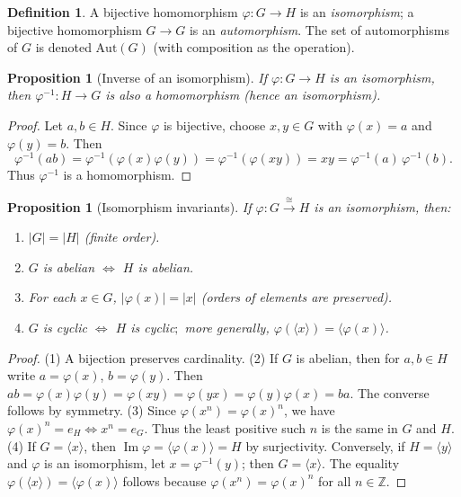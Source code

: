 \documentclass[12pt]{article}
\newtheorem{proposition}[theorem]{Proposition}
\theoremstyle{definition}
\newtheorem{definition}{Definition}
\begin{document}
\begin{definition}
A bijective homomorphism $\varphi:G\to H$ is an \emph{isomorphism}; a bijective homomorphism $G\to G$
is an \emph{automorphism}. The set of automorphisms of $G$ is denoted $\mathrm{Aut}(G)$
(with composition as the operation).
\end{definition}

\begin{proposition}[Inverse of an isomorphism]
If $\varphi:G\to H$ is an isomorphism, then $\varphi^{-1}:H\to G$ is also a homomorphism (hence an isomorphism).
\end{proposition}

\begin{proof}
Let $a,b\in H$. Since $\varphi$ is bijective, choose $x,y\in G$ with $\varphi(x)=a$ and $\varphi(y)=b$.
Then
\[
\varphi^{-1}(ab) = \varphi^{-1}(\varphi(x)\varphi(y)) = \varphi^{-1}(\varphi(xy)) = xy
= \varphi^{-1}(a)\,\varphi^{-1}(b).
\]
Thus $\varphi^{-1}$ is a homomorphism.
\end{proof}

\begin{proposition}[Isomorphism invariants]
If $\varphi:G\stackrel{\cong}{\longrightarrow} H$ is an isomorphism, then:
\begin{enumerate}
    \item $|G|=|H|$ (finite order).
    \item $G$ is abelian $\iff$ $H$ is abelian.
    \item For each $x\in G$, $|\varphi(x)|=|x|$ (orders of elements are preserved).
    \item $G$ is cyclic $\iff$ $H$ is cyclic$;$ more generally, $\varphi(\langle x\rangle)=\langle \varphi(x)\rangle$.
\end{enumerate}
\end{proposition}

\begin{proof}
(1) A bijection preserves cardinality.  
(2) If $G$ is abelian, then for $a,b\in H$ write $a=\varphi(x)$, $b=\varphi(y)$.
Then $ab=\varphi(x)\varphi(y)=\varphi(xy)=\varphi(yx)=\varphi(y)\varphi(x)=ba$.
The converse follows by symmetry.  
(3) Since $\varphi(x^n)=\varphi(x)^n$, we have $\varphi(x)^n=e_H \iff x^n=e_G$.
Thus the least positive such $n$ is the same in $G$ and $H$.  
(4) If $G=\langle x\rangle$, then $\operatorname{Im}\varphi=\langle \varphi(x)\rangle=H$ by surjectivity.
Conversely, if $H=\langle y\rangle$ and $\varphi$ is an isomorphism, let $x=\varphi^{-1}(y)$; then $G=\langle x\rangle$.
The equality $\varphi(\langle x\rangle)=\langle \varphi(x)\rangle$ follows because $\varphi(x^n)=\varphi(x)^n$ for all $n\in\mathbb{Z}$.
\end{proof}
\end{document}
